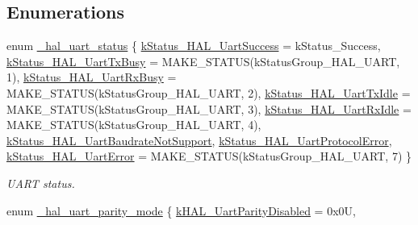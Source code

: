 \subsection*{Enumerations}
\begin{DoxyCompactItemize}
\item 
enum \mbox{\hyperlink{group___u_a_r_t___adapter_gaaaffa428b5b9f79a5e510eb34c74f8f6}{\+\_\+hal\+\_\+uart\+\_\+status}} \{ \newline
\mbox{\hyperlink{group___u_a_r_t___adapter_ggaaaffa428b5b9f79a5e510eb34c74f8f6ace53957d3570fb00454fdd51484e8a4b}{k\+Status\+\_\+\+H\+A\+L\+\_\+\+Uart\+Success}} = k\+Status\+\_\+\+Success, 
\mbox{\hyperlink{group___u_a_r_t___adapter_ggaaaffa428b5b9f79a5e510eb34c74f8f6aef9c1d027988265c69aef95219493bf6}{k\+Status\+\_\+\+H\+A\+L\+\_\+\+Uart\+Tx\+Busy}} = M\+A\+K\+E\+\_\+\+S\+T\+A\+T\+US(k\+Status\+Group\+\_\+\+H\+A\+L\+\_\+\+U\+A\+RT, 1), 
\mbox{\hyperlink{group___u_a_r_t___adapter_ggaaaffa428b5b9f79a5e510eb34c74f8f6a58742a06efe6f0a686c82d1bbf1347e4}{k\+Status\+\_\+\+H\+A\+L\+\_\+\+Uart\+Rx\+Busy}} = M\+A\+K\+E\+\_\+\+S\+T\+A\+T\+US(k\+Status\+Group\+\_\+\+H\+A\+L\+\_\+\+U\+A\+RT, 2), 
\mbox{\hyperlink{group___u_a_r_t___adapter_ggaaaffa428b5b9f79a5e510eb34c74f8f6a191f28681f86e8a374711e455949fa3d}{k\+Status\+\_\+\+H\+A\+L\+\_\+\+Uart\+Tx\+Idle}} = M\+A\+K\+E\+\_\+\+S\+T\+A\+T\+US(k\+Status\+Group\+\_\+\+H\+A\+L\+\_\+\+U\+A\+RT, 3), 
\newline
\mbox{\hyperlink{group___u_a_r_t___adapter_ggaaaffa428b5b9f79a5e510eb34c74f8f6acd7b1ae53a0bcb77d67cc66701c3c7f5}{k\+Status\+\_\+\+H\+A\+L\+\_\+\+Uart\+Rx\+Idle}} = M\+A\+K\+E\+\_\+\+S\+T\+A\+T\+US(k\+Status\+Group\+\_\+\+H\+A\+L\+\_\+\+U\+A\+RT, 4), 
\mbox{\hyperlink{group___u_a_r_t___adapter_ggaaaffa428b5b9f79a5e510eb34c74f8f6a56abdea917d92b3a62fb1ee09bfc416f}{k\+Status\+\_\+\+H\+A\+L\+\_\+\+Uart\+Baudrate\+Not\+Support}}, 
\mbox{\hyperlink{group___u_a_r_t___adapter_ggaaaffa428b5b9f79a5e510eb34c74f8f6a4dad70c2171b2445de1224d65645164e}{k\+Status\+\_\+\+H\+A\+L\+\_\+\+Uart\+Protocol\+Error}}, 
\mbox{\hyperlink{group___u_a_r_t___adapter_ggaaaffa428b5b9f79a5e510eb34c74f8f6a3e539021cfde4b3468c00de4f834e84e}{k\+Status\+\_\+\+H\+A\+L\+\_\+\+Uart\+Error}} = M\+A\+K\+E\+\_\+\+S\+T\+A\+T\+US(k\+Status\+Group\+\_\+\+H\+A\+L\+\_\+\+U\+A\+RT, 7)
 \}
\begin{DoxyCompactList}\small\item\em U\+A\+RT status. \end{DoxyCompactList}\item 
enum \mbox{\hyperlink{group___u_a_r_t___adapter_ga4bfc5f54ba1569ae2dfcc1d7ae0be0f3}{\+\_\+hal\+\_\+uart\+\_\+parity\+\_\+mode}} \{ \mbox{\hyperlink{group___u_a_r_t___adapter_gga4bfc5f54ba1569ae2dfcc1d7ae0be0f3a08fcd92b9342a589174cb30bc87c8536}{k\+H\+A\+L\+\_\+\+Uart\+Parity\+Disabled}} = 0x0U, 

\end{DoxyCompactItemize}
